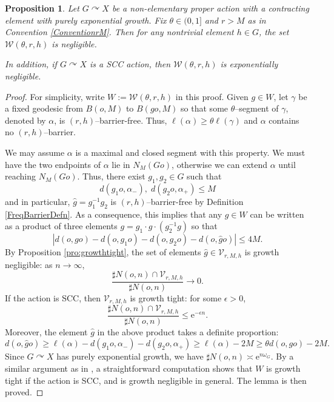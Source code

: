 \documentclass{amsart}
\newtheorem{prop}[thm]{Proposition}
\theoremstyle{definition}
\theoremstyle{remark}
\newcommand{\act}{\curvearrowright}
\newcommand{\U}{ X}
\newcommand{\e}[1]{\omega_{#1}}
\newcommand{\len }{\ell}
\begin{document}
\begin{prop}\label{frequentbarriers}
Let   $G\act \U$ be a non-elementary proper action with a contracting element with purely exponential growth. Fix $\theta\in (0,1]$ and $r>M$ as in Convention \ref{ConventionrM}. Then for any nontrivial element $h\in G$, the set $\mathcal W(\theta,r,h)$    is   negligible.

In addition, if $G\act \U$ is a SCC action, then  $\mathcal W(\theta,r,h)$    is exponentially negligible.
\end{prop}
\begin{proof}
For simplicity, write $ W:=\mathcal W(\theta,r,h)$ in this proof.
Given $g\in  W$,  let $\gamma$ be a  fixed geodesic  from $B(o, M)$ to $B(go, M)$ so that some $\theta$--segment of $\gamma$, denoted by $\alpha$,    is $(r, h)$--barrier-free. Thus,  $\ell(\alpha)\ge \theta \ell(\gamma)$ and $\alpha$ contains no $(r, h)$--barrier. 

We may assume $\alpha$ is a maximal and closed segment with this property. We must have the two endpoints of $\alpha$ lie in $N_M(Go)$, otherwise we can extend $\alpha$ until reaching $N_M(Go)$. Thus, there exist $g_1, g_2\in G$ such that $$d(g_1o, \alpha_-), \; d(g_2o,\alpha_+)\le  M$$ and in particular,  $\hat g=g_1^{-1}g_2$ is $(r, h)$--barrier-free by Definition \ref{FreqBarrierDefn}. As a consequence, this implies that any $g\in  W$ can be written as a product of three elements $g=g_1\cdot  \hat g \cdot (g_2^{-1} g)$ so that 
 $$|d(o,go)- d(o,g_1o)-d(o,g_2o)-d(o,\hat g o)|\le 4M.$$  
By Proposition \ref{pro:growthtight},  the set of elements $\hat g\in \mathcal V_{r, M, h}$ is growth negligible: as $n\to\infty$,
$$
\frac{\sharp N(o,n)\cap \mathcal V_{r, M, h}}{\sharp N(o,n)} \to 0.
$$
If the action is SCC, then $\mathcal V_{r, M, h}$ is growth tight: for some $\epsilon>0$, 
$$
\frac{\sharp N(o,n)\cap \mathcal V_{r, M, h}}{\sharp N(o,n)} \le \mathrm{e}^{-\epsilon n}.
$$
Moreover,  the element $\hat g$ in the above product takes a definite proportion:  $$d(o, \hat go)\ge  \len(\alpha)-d(g_1o, \alpha_-)-d(g_2o, \alpha_+)\ge \ell(\alpha)-2M\ge \theta d(o,go)-2M.$$
Since $G\act \U$ has purely exponential growth, we have $\sharp  N(o,n)\asymp \mathrm{e}^{n\e G}$. By a similar argument as in \cite[Lemma 3.9]{GYANG}, a straightforward computation shows that $ W$ is growth tight if the action is SCC, and is growth negligible in general.   The lemma is then proved.
\end{proof}
\end{document}
